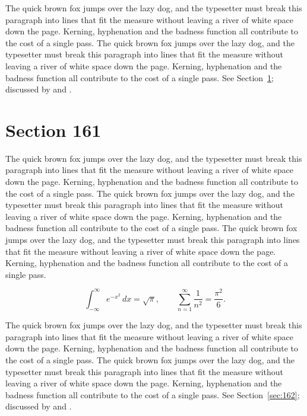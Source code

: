 \documentclass{article}
\begin{document}
The quick brown fox jumps over the lazy dog, and the typesetter must break this paragraph into lines that fit the measure without leaving a river of white space down the page. Kerning, hyphenation and the badness function all contribute to the cost of a single pass. The quick brown fox jumps over the lazy dog, and the typesetter must break this paragraph into lines that fit the measure without leaving a river of white space down the page. Kerning, hyphenation and the badness function all contribute to the cost of a single pass. 
See Section~\ref{sec:161}; discussed by \textcite{k1} and \textcite{l3}.
\section{Section 161}
\label{sec:161}
The quick brown fox jumps over the lazy dog, and the typesetter must break this paragraph into lines that fit the measure without leaving a river of white space down the page. Kerning, hyphenation and the badness function all contribute to the cost of a single pass. The quick brown fox jumps over the lazy dog, and the typesetter must break this paragraph into lines that fit the measure without leaving a river of white space down the page. Kerning, hyphenation and the badness function all contribute to the cost of a single pass. The quick brown fox jumps over the lazy dog, and the typesetter must break this paragraph into lines that fit the measure without leaving a river of white space down the page. Kerning, hyphenation and the badness function all contribute to the cost of a single pass. 

\begin{equation}\label{eq:161}
\int_{-\infty}^{\infty} e^{-x^{2}}\,dx = \sqrt{\pi}, \qquad
\sum_{n=1}^{\infty} \frac{1}{n^{2}} = \frac{\pi^{2}}{6}.
\end{equation}

The quick brown fox jumps over the lazy dog, and the typesetter must break this paragraph into lines that fit the measure without leaving a river of white space down the page. Kerning, hyphenation and the badness function all contribute to the cost of a single pass. The quick brown fox jumps over the lazy dog, and the typesetter must break this paragraph into lines that fit the measure without leaving a river of white space down the page. Kerning, hyphenation and the badness function all contribute to the cost of a single pass. 
See Section~\ref{sec:162}; discussed by \textcite{k2} and \textcite{l4}.
\end{document}
